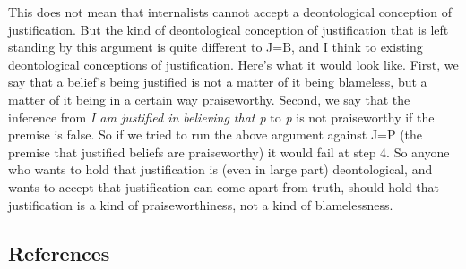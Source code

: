 \documentclass[
  11pt,
  letterpaper,
  DIV=11,
  numbers=noendperiod,
  oneside]{scrartcl}
\begin{document}
This does not mean that internalists cannot accept a deontological
conception of justification. But the kind of deontological conception of
justification that is left standing by this argument is quite different
to J=B, and I think to existing deontological conceptions of
justification. Here's what it would look like. First, we say that a
belief's being justified is not a matter of it being blameless, but a
matter of it being in a certain way praiseworthy. Second, we say that
the inference from \emph{I am justified in believing that p} to \emph{p}
is not praiseworthy if the premise is false. So if we tried to run the
above argument against J=P (the premise that justified beliefs are
praiseworthy) it would fail at step 4. So anyone who wants to hold that
justification is (even in large part) deontological, and wants to accept
that justification can come apart from truth, should hold that
justification is a kind of praiseworthiness, not a kind of
blamelessness.

\subsection*{References}\label{references}
\end{document}
